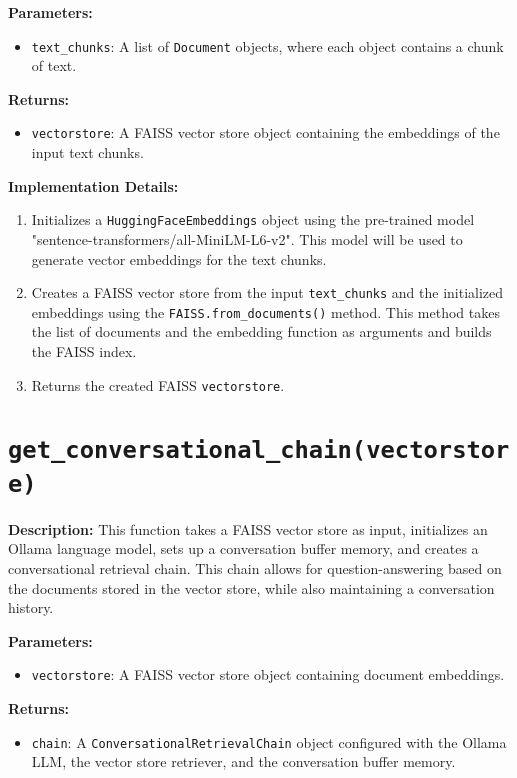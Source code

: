 \documentclass{article}
\begin{document}
\textbf{Parameters:}
\begin{itemize}
    \item \texttt{text\_chunks}: A list of \texttt{Document} objects, where each object contains a chunk of text.
\end{itemize}

\textbf{Returns:}
\begin{itemize}
    \item \texttt{vectorstore}: A FAISS vector store object containing the embeddings of the input text chunks.
\end{itemize}

\textbf{Implementation Details:}
\begin{enumerate}
    \item Initializes a \texttt{HuggingFaceEmbeddings} object using the pre-trained model "sentence-transformers/all-MiniLM-L6-v2". This model will be used to generate vector embeddings for the text chunks.
    \item Creates a FAISS vector store from the input \texttt{text\_chunks} and the initialized embeddings using the \texttt{FAISS.from\_documents()} method. This method takes the list of documents and the embedding function as arguments and builds the FAISS index.
    \item Returns the created FAISS \texttt{vectorstore}.
\end{enumerate}

\section*{\texttt{get\_conversational\_chain(vectorstore)}}

\textbf{Description:} This function takes a FAISS vector store as input, initializes an Ollama language model, sets up a conversation buffer memory, and creates a conversational retrieval chain. This chain allows for question-answering based on the documents stored in the vector store, while also maintaining a conversation history.

\textbf{Parameters:}
\begin{itemize}
    \item \texttt{vectorstore}: A FAISS vector store object containing document embeddings.
\end{itemize}

\textbf{Returns:}
\begin{itemize}
    \item \texttt{chain}: A \texttt{ConversationalRetrievalChain} object configured with the Ollama LLM, the vector store retriever, and the conversation buffer memory.
\end{itemize}
\end{document}
